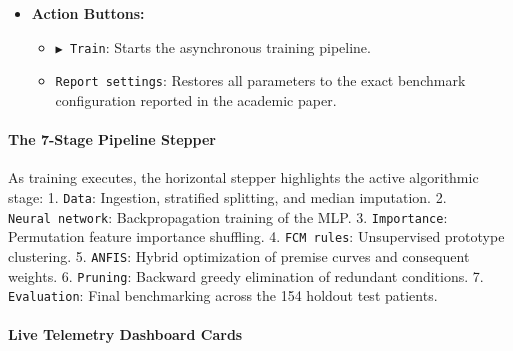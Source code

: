 \begin{itemize}
  \begin{itemize}
  \tightlist
  \item
    \texttt{Synthetic\ patients\ asked\ to\ the\ network} (0 to 4,000):
    Number of synthetic oracle neighborhood queries used to populate
    boundary regions (Default: 2,000).
  \item
    \texttt{Prune\ conditions\ and\ rules}: Enables the automated greedy
    backward pruning engine.
  \item
    \texttt{Allowed\ fidelity\ loss\ while\ pruning} (\(0\%\) to
    \(5\%\)): Maximum permitted validation fidelity drop per pruning
    step (Default: \(1\%\)).
  \item
    \texttt{Random\ seed}: Controls synthetic sampling and cluster
    initialization (Default: 42).
  \item
    \texttt{Slow\ motion}: Adds an artificial 25ms delay per epoch so
    users can visually watch the curves move live on projector screens.
  \end{itemize}
\item
  \textbf{Action Buttons:}

  \begin{itemize}
  \tightlist
  \item
    \texttt{▶\ Train}: Starts the asynchronous training pipeline.
  \item
    \texttt{Report\ settings}: Restores all parameters to the exact
    benchmark configuration reported in the academic paper.
  \end{itemize}
\end{itemize}

\paragraph{The 7-Stage Pipeline
Stepper}\label{the-7-stage-pipeline-stepper}

As training executes, the horizontal stepper highlights the active
algorithmic stage: 1. \texttt{Data}: Ingestion, stratified splitting,
and median imputation. 2. \texttt{Neural\ network}: Backpropagation
training of the MLP. 3. \texttt{Importance}: Permutation feature
importance shuffling. 4. \texttt{FCM\ rules}: Unsupervised prototype
clustering. 5. \texttt{ANFIS}: Hybrid optimization of premise curves and
consequent weights. 6. \texttt{Pruning}: Backward greedy elimination of
redundant conditions. 7. \texttt{Evaluation}: Final benchmarking across
the 154 holdout test patients.

\paragraph{Live Telemetry Dashboard
Cards}\label{live-telemetry-dashboard-cards}

